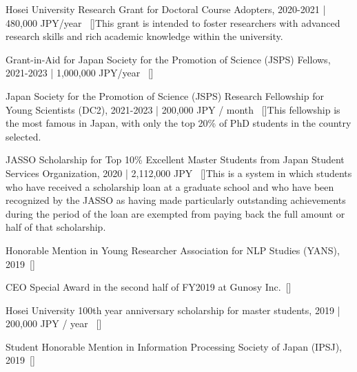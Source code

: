 
\begin{talks}
    \award
    {Hosei University Research Grant for Doctoral Course Adopters, 2020-2021 | }{}{480,000 JPY/year \normalfont ~[\href{https://www.hosei.ac.jp/gs/gakuhi/gakuhi-shogakukin/shogakukin/kenkyujoseikin/}{\small{\websiteSymbol}}]}{This grant is intended to foster researchers with advanced research skills and rich academic knowledge within the university.}

    \award
    {Grant-in-Aid for Japan Society for the Promotion of Science (JSPS) Fellows, 2021-2023 | }{}{1,000,000 JPY/year \normalfont ~[\href{https://kaken.nii.ac.jp/en/grant/KAKENHI-PROJECT-21J14143/}{\small{\websiteSymbol}}]}{}

    \award
    {Japan Society for the Promotion of Science (JSPS) Research Fellowship for Young Scientists (DC2), 2021-2023 | }{}{200,000 JPY / month \normalfont ~[\href{https://www.jsps.go.jp/english/e-pd/index.html}{\small{\websiteSymbol}}]}{This fellowship is the most famous in Japan, with only the top 20\% of PhD students in the country selected.}

    \award
    {JASSO Scholarship for Top 10\% Excellent Master Students from Japan Student Services Organization, 2020 | }{}{2,112,000 JPY \normalfont ~[\href{https://www.jsps.go.jp/english/e-pd/index.html}{\small{\websiteSymbol}}]}{This is a system in which students who have received a scholarship loan at a graduate school and who have been recognized by the JASSO as having made particularly outstanding achievements during the period of the loan are exempted from paying back the full amount or half of that scholarship.}

    \award
    {Honorable Mention in Young Researcher Association for NLP Studies (YANS), 2019}{}{\normalfont ~[\href{https://www.hosei.ac.jp/gs/NEWS/zaigaku/koganei/20190920/}{\small{\websiteSymbol}}]}{}

    \award
    {CEO Special Award in the second half of FY2019 at Gunosy Inc.}{}{\normalfont ~[\href{https://gunosiru.gunosy.co.jp/entry/party-7th-secondhalf}{\small{\websiteSymbol}}]}{}

    \award
    {Hosei University 100th year anniversary scholarship for master students, 2019 | }{}{200,000 JPY / year \normalfont ~[\href{https://www.hosei.ac.jp/application/files/2715/8977/4261/2020_3-3.pdf}{\small{\websiteSymbol}}]}{}

    \award
    {Student Honorable Mention in Information Processing Society of Japan (IPSJ), 2019}{}{\normalfont ~[\href{https://www.hosei.ac.jp/gs/NEWS/topics/jusho/190411_4/}{\small{\websiteSymbol}}]}{}

\end{talks}

